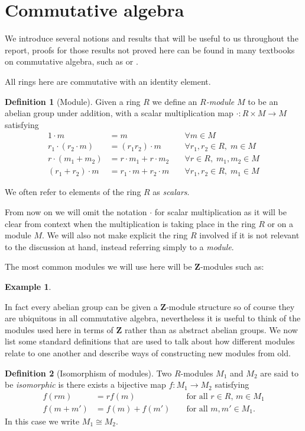 \documentclass[a4paper,abstracton,bibtotoc]{scrreprt}
\theoremstyle{definition}
\newtheorem{defn}{Definition}
\newtheorem{ex}{Example}
\newcommand{\ZZ}{\mathbf{Z}}
\begin{document}
\section{Commutative algebra}
We introduce several notions and results that will be useful to us throughout the report, proofs for those results not proved here can be found in many textbooks on commutative algebra, such as \cite{am} or \cite{matsumura}.

All rings here are commutative with an identity element.
\begin{defn}[Module]
Given a ring $R$ we define an \emph{$R$-module} $M$ to be an abelian group under addition, with a scalar multiplication map $\cdot \colon R\times M \to M$ satisfying
\begin{align*}
1\cdot m &= m \; &&\forall m\in M \\
r_1\cdot(r_2 \cdot m) &= (r_1r_2)\cdot m \; &&\forall r_1,r_2\in R,\; m\in M \\
r\cdot(m_1 + m_2) &= r\cdot m_1 + r\cdot m_2 \; &&\forall r\in R, \; m_1,m_2\in M \\
(r_1 + r_2)\cdot m &= r_1\cdot m + r_2\cdot m \; &&\forall r_1,r_2\in R, \; m_1\in M
\end{align*}
\end{defn}

We often refer to elements of the ring $R$ as \emph{scalars}.

From now on we will omit the notation $\cdot$ for scalar multiplication as it will be clear from context when the multiplication is taking place in the ring $R$ or on a module $M$.
We will also not make explicit the ring $R$ involved if it is not relevant to the discussion at hand, instead referring simply to a \emph{module}.

The most common modules we will use here will be $\ZZ$-modules such as:
\begin{ex}

\end{ex}
In fact every abelian group can be given a $\ZZ$-module structure so of course they are ubiquitous in all commutative algebra, nevertheless it is useful to think of the modules used here in terms of $\ZZ$ rather than as abstract abelian groups.
We now list some standard definitions that are used to talk about how different modules relate to one another and describe ways of constructing new modules from old.

\begin{defn}[Isomorphism of modules]
Two $R$-modules $M_1$ and $M_2$ are said to be \emph{isomorphic} is there exists a bijective map $f\colon M_1 \to M_2$ satisfying
\begin{align*}
f(rm) &= rf(m) &&\text{ for all $r\in R$, $m\in M_1$}\\
f(m + m') &= f(m) + f(m')&&\text{ for all $m,m'\in M_1$}.
\end{align*}
In this case we write $M_1\cong M_2$.
\end{defn}
\end{document}
